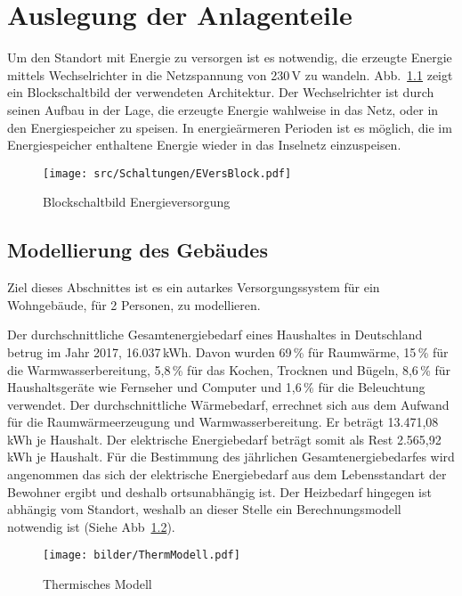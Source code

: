 \chapter{Auslegung der Anlagenteile} 

Um den Standort mit Energie zu versorgen ist es notwendig, die erzeugte Energie mittels Wechselrichter in die Netzspannung von 230\,V zu wandeln.
Abb.~\ref{fig:Blockschaltbild} zeigt ein Blockschaltbild der verwendeten Architektur.
Der Wechselrichter ist durch seinen Aufbau in der Lage, die erzeugte Energie wahlweise in das Netz, oder in den Energiespeicher zu speisen.
In energieärmeren Perioden ist es möglich, die im Energiespeicher enthaltene Energie wieder in das Inselnetz einzuspeisen.
\begin{figure}[h]
  \centering
  \texttt{[image: src/Schaltungen/EVersBlock.pdf]}
  \caption{Blockschaltbild Energieversorgung}\label{fig:Blockschaltbild}
\end{figure}

\section{Modellierung des Gebäudes}
Ziel dieses Abschnittes ist es ein autarkes Versorgungssystem für ein Wohngebäude, für 2 Personen, zu modellieren.

Der durchschnittliche Gesamtenergiebedarf eines Haushaltes in Deutschland betrug im Jahr 2017, 16.037\,kWh\cite{Webp:DestatisEnergieverbrauch}.
Davon wurden 69\,\% für Raumwärme, 15\,\% für die Warmwasserbereitung, 5,8\,\% für das Kochen, 
Trocknen und Bügeln, 8,6\,\% für Haushaltsgeräte wie Fernseher und Computer und 1,6\,\% für die Beleuchtung verwendet\cite{Webp:DestatisEnergieverbrauch}.
Der durchschnittliche Wärmebedarf, errechnet sich aus dem Aufwand für die Raumwärmeerzeugung und Warmwasserbereitung. Er beträgt 13.471,08\,kWh je Haushalt.
Der elektrische Energiebedarf beträgt somit als Rest 2.565,92\,kWh je Haushalt.
Für die Bestimmung des jährlichen Gesamtenergiebedarfes wird angenommen das sich der elektrische Energiebedarf aus dem Lebensstandart der Bewohner ergibt und deshalb ortsunabhängig ist.
Der Heizbedarf hingegen ist abhängig vom Standort, weshalb an dieser Stelle ein Berechnungsmodell notwendig ist (Siehe Abb~\ref{fig:THERMM}).
\begin{figure}[h]
  \centering 
  \texttt{[image: bilder/ThermModell.pdf]}
  \caption[Thermisches Modell]{Thermisches Modell}\label{fig:THERMM}
\end{figure}

